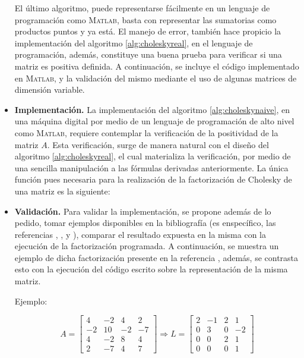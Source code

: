 \documentclass[11pt, spanish]{article}
\begin{document}
\begin{itemize}
El último algoritmo, puede representarse fácilmente en un lenguaje de programación como \textsc{Matlab}, basta con representar las sumatorias como productos puntos y ya está. El manejo de error, también hace propicio la implementación del algoritmo \ref{alg:choleskyreal}, en el lenguaje de programación, además, constituye una buena prueba para verificar si una matriz es positiva definida. A continuación, se incluye el código implementado en \textsc{Matlab}, y la validación del mismo mediante el uso de algunas matrices de dimensión variable.

\item \textbf{Implementación.} La implementación del algoritmo \ref{alg:choleskynaive}, en una máquina digital por medio de un lenguaje de programación de alto nivel como \textsc{Matlab}, requiere contemplar la verificación de la positividad de la matriz $A$. Esta verificación, surge de manera natural con el diseño del algoritmo \ref{alg:choleskyreal}, el cual materializa la verificación, por medio de una sencilla manipulación a las fórmulas derivadas anteriormente. La única función pues necesaria para la realización de la factorización de Cholesky de una matriz es la siguiente:



\newpage

\item \textbf{Validación.} Para validar la implementación, se propone además de lo pedido, tomar ejemplos disponibles en la bibliografía (es enspecífico, las referencias \cite{cheney2007numerical}, \cite{watkins2004fundamentals}, y \cite{ford2014numerical}), comparar el resultado expuesta en la misma con la ejecución de la factorización programada. A continuación, se muestra un ejemplo de dicha factorización presente en la referencia \cite{watkins2004fundamentals}, además, se contrasta esto con la ejecución del código escrito sobre la representación de la misma matriz.

Ejemplo:

$$A = \begin{bmatrix}
    4 & -2 & 4 & 2\\ -2 & 10 & -2 & -7\\ 4 & -2 & 8 & 4\\ 2 & -7 & 4 & 7 
\end{bmatrix} \Rightarrow L = \begin{bmatrix} 2 & -1 & 2 & 1\\ 0 & 3 & 0 & -2\\ 0 & 0 & 2 & 1\\ 0 & 0 & 0 & 1 \end{bmatrix}$$


\end{itemize}
\end{document}
